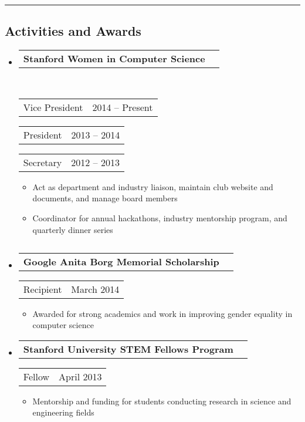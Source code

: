 \documentclass[10pt,letterpaper]{article}
\makeatletter
\newcommand{\topheaderrow}[2]
{\begin{tabular*}{\linewidth}{l@{\extracolsep{\fill}}r}
    \textbf{#1} &
    \textbf{#2}
    \vspace{0.2ex}
\end{tabular*}}
\newcommand{\botheaderrow}[2]
{\begin{tabular*}{\linewidth}{l@{\extracolsep{\fill}}r}
    #1 &
    #2 \\
\end{tabular*}}
\makeatother
\begin{document}
\hrule
\vspace{-0.4em}
\setlength{\columnsep}{26pt}
\begin{multicols}{2}
\subsection*{Activities and Awards}

\begin{itemize}
    \parskip=0.1em
    \item
    \topheaderrow
        {Stanford Women in Computer Science} {} \\
    \botheaderrow
        {Vice President}
        {2014 -- Present}
    \botheaderrow
        {President}
        {2013 -- 2014}
    \botheaderrow
        {Secretary}
        {2012 -- 2013}
    
    \begin{itemize}[label={-}, labelsep=5pt]
        \item Act as department and industry liaison, maintain club website and documents, and manage board members
        \item Coordinator for annual hackathons, industry mentorship program, and quarterly dinner series
    \end{itemize}
\end{itemize}

\columnbreak

\subsection*{}

\begin{itemize}
    \item \topheaderrow{Google Anita Borg Memorial Scholarship}{}
    \botheaderrow{Recipient}{March 2014}
    \begin{itemize}[label={-}, labelsep=5pt]
    \item Awarded for strong academics and work in improving gender equality in computer science
    \end{itemize}
    \item \topheaderrow{Stanford University STEM Fellows Program}{}
    \botheaderrow{Fellow}{April 2013}
    \begin{itemize}[label={-}, labelsep=5pt]
    \item Mentorship and funding for students conducting research in science and engineering fields
    \end{itemize}
\end{itemize}


\end{multicols}
\end{document}
